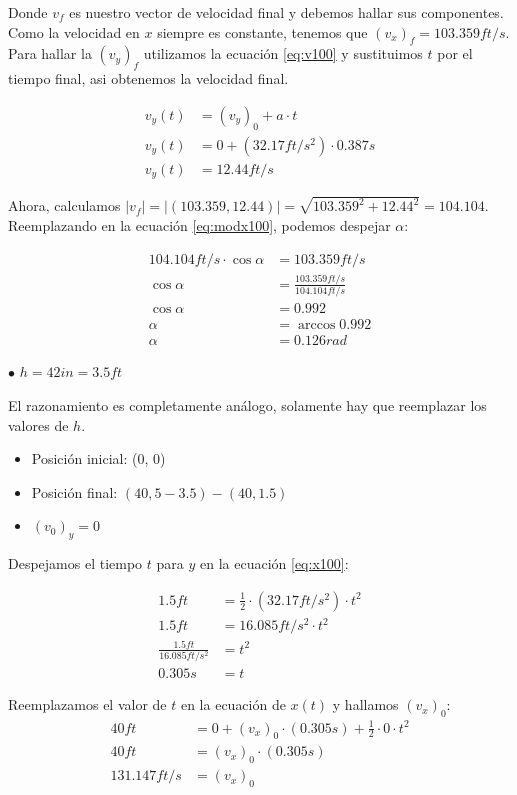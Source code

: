 \documentclass[11pt]{article}
\begin{document}
Donde $v_f$ es nuestro vector de velocidad final y debemos hallar sus componentes.
Como la velocidad en $x$ siempre es constante, tenemos que $(v_x)_f = 103.359 ft/s$.
Para hallar la $(v_y)_f$ utilizamos la ecuación \ref{eq:v100} y sustituimos $t$ por el 
tiempo final, asi obtenemos la velocidad final.

\begin{align*}
  v_y(t) &= (v_y)_0 + a \cdot t \\
  v_y(t) &= 0 + (32.17ft/s^2) \cdot 0.387s \\
  v_y(t) &= 12.44ft/s
\end{align*}

Ahora, calculamos $\vert v_f \vert = \vert (103.359, 12.44) \vert = \sqrt{103.359^2 + 12.44^2} = 104.104$. \\

Reemplazando en la ecuación \ref{eq:modx100}, podemos despejar $\alpha$:

\begin{align*}
  104.104ft/s \cdot \cos \alpha &= 103.359ft/s \\
   \cos \alpha &= \frac{103.359ft/s}{104.104ft/s} \\
   \cos \alpha &= 0.992 \\
   \alpha &= \arccos 0.992 \\
   \alpha &= 0.126rad
\end{align*}

$\bullet$ $h = 42in = 3.5ft$

El razonamiento es completamente análogo, solamente hay que reemplazar los valores de $h$.

\begin{itemize}
  \item Posición inicial: (0, 0)
  \item Posición final: $(40, 5-3.5) - (40, 1.5)$
  \item $(v_0)_y = 0$
\end{itemize}

Despejamos el tiempo $t$ para $y$ en la ecuación \ref{eq:x100}:

\begin{align*}
  1.5ft &= \frac{1}{2} \cdot (32.17ft/s^2) \cdot t^2 \\
  1.5ft &= 16.085ft/s^2 \cdot t^2  \\
  \frac{1.5ft}{16.085ft/s^2} &= t^2 \\
  0.305s &= t
\end{align*}

Reemplazamos el valor de $t$ en la ecuación de $x(t)$ y hallamos $(v_x)_0$:
\begin{align*}
  40ft &= 0 + (v_x)_0 \cdot (0.305s) + \frac{1}{2} \cdot 0 \cdot t^2 \\
  40ft &= (v_x)_0 \cdot (0.305s) \\
  131.147ft/s &= (v_x)_0
\end{align*}
\end{document}

